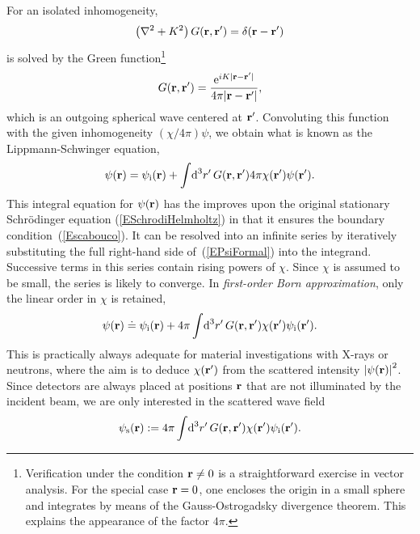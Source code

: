 For an isolated inhomogeneity,
\begin{equation}\label{EHelmholtzForGreen}
  \left(\mathbf{\nabla}^2+K^2\right)G(\mathbf{r},\mathbf{r}') = \delta(\mathbf{r}-\mathbf{r}')
\end{equation}
%
%
is solved by the Green function\footnote
{Verification under the condition $\mathbf{r}\ne0$
is a straightforward exercise in vector analysis.
For the special case $\mathbf{r}=0$,
one encloses the origin in a small sphere
and integrates by means of the Gauss-Ostrogadsky divergence theorem.
This explains the appearance of the factor $4\pi$.}
\begin{equation}\label{EGreens1}
  G(\mathbf{r},\mathbf{r}') = \frac{\text{e}^{iK|\mathbf{r}-\mathbf{r}'|}}{4\pi |\mathbf{r}-\mathbf{r}'|},
\end{equation}
which is an outgoing spherical wave centered at $\mathbf{r}'$.
Convoluting this function with the given inhomogeneity $(\chi/4\pi)\psi$,
we obtain what is known as the Lippmann-Schwinger equation,
\begin{equation}\label{EPsiFormal}
  \psi(\mathbf{r})
  = \psi_{\text{i}}(\mathbf{r})
  + \int\!\text{d}^3r'\, G(\mathbf{r},\mathbf{r}') 4\pi\chi(\mathbf{r}')\psi(\mathbf{r}').
\end{equation}
This integral equation for $\psi(\mathbf{r})$ has the improves
upon the original stationary Schrödinger equation (\ref{ESchrodiHelmholtz})
in that it ensures the boundary condition~(\ref{Escabouco}).
It can be resolved into an infinite series
by iteratively substituting the full right-hand side of~(\ref{EPsiFormal})
into the integrand.
Successive terms in this series contain rising powers of $\chi$.
Since $\chi$ is assumed to be small, the series is likely to converge.
In \textit{first-order Born approximation},
only the linear order in $\chi$ is retained,
\begin{equation}\label{EBorn}
  \psi(\mathbf{r})
  \doteq \psi_{\text{i}}(\mathbf{r})
  + 4\pi \int\!\text{d}^3r'\, G(\mathbf{r},\mathbf{r}') \chi(\mathbf{r}') \psi_{\text{i}}(\mathbf{r}').
\end{equation}
This is practically always adequate for
material investigations with X-rays or neutrons,
where the aim is to 
deduce $\chi(\mathbf{r}')$ from the scattered intensity ${|\psi(\mathbf{r})|}^2$.
Since detectors are always placed at positions $\mathbf{r}$
that are not illuminated by the incident beam,
we are only interested in the scattered wave field
\begin{equation}\label{EBornS}
  \psi_\text{s}(\mathbf{r})
  :=
  4\pi \int\!\text{d}^3r'\, G(\mathbf{r},\mathbf{r}') \chi(\mathbf{r}') \psi_{\text{i}}(\mathbf{r}').
\end{equation}
%
%

